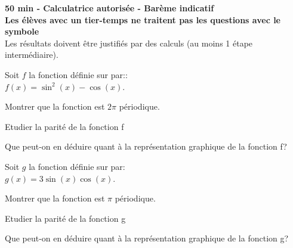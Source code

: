 \documentclass[12pt,a4paper]{article}  %
\begin{document}
\graphicspath{{../images/}}

\begin{center}

\end{center}


\begin{center}\textbf{50 min - Calculatrice autorisée - Barème indicatif}\\
\textbf{Les élèves avec un tier-temps ne traitent pas les questions avec  le symbole }\\
Les résultats doivent être justifiés par des calculs (au moins 1 étape intermédiaire).
\end{center}

%
\vspace{-.3cm} 
\begin{minipage}[c]{0.48\linewidth}
	Soit $f$ la fonction définie sur \R par::\\
	$f(x)=\sin^2(x)-\cos(x)$.
	\begin{enumMet}
		\item Montrer que la fonction est $2\pi$ périodique.
		\item Etudier la parité de la fonction f
		\item Que peut-on en déduire quant à la représentation graphique de la fonction f?
	\end{enumMet}
\end{minipage} \hfill
\begin{minipage}[c]{0.48\linewidth}
	Soit $g$ la fonction définie sur \R par:\\
	$g(x)=3\sin(x)\cos(x)$.
	\begin{enumMet}
		\item {} Montrer que la fonction est $\pi$ périodique.
		\item {} Etudier la parité de la fonction g
		\item {} Que peut-on en déduire quant à la représentation graphique de la fonction g?
	\end{enumMet}
\end{minipage}
\end{document}
